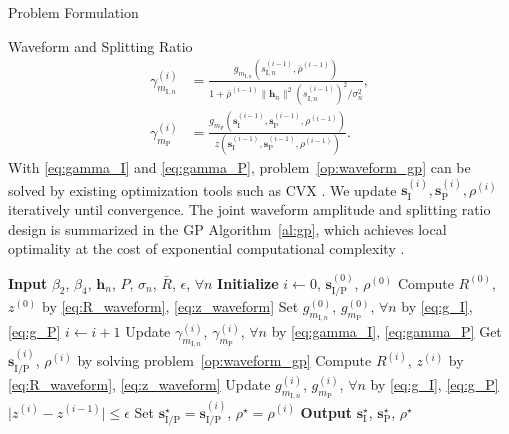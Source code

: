 \documentclass[journal]{IEEEtran}
\begin{document}
\begin{section}{Problem Formulation}
\begin{subsection}{Waveform and Splitting Ratio}
			\begin{align}
				\gamma_{m_{\mathrm{I},n}}^{(i)} & = \frac{g_{m_{\mathrm{I},n}}(s_{\mathrm{I},n}^{(i-1)},\bar{\rho}^{(i-1)})}{1+{\bar{\rho}^{(i-1)}\lVert{\boldsymbol{h}_n}\rVert^2 (s_{\mathrm{I},n}^{(i-1)})^2}\big/{\sigma_n^2}}\label{eq:gamma_I},\\
				\gamma_{m_\mathrm{P}}^{(i)} & = \frac{g_{m_\mathrm{P}}(\boldsymbol{s}_{\mathrm{I}}^{(i-1)},\boldsymbol{s}_\mathrm{P}^{(i-1)},\rho^{(i-1)})}{z(\boldsymbol{s}_{\mathrm{I}}^{(i-1)},\boldsymbol{s}_\mathrm{P}^{(i-1)},\rho^{(i-1)})}\label{eq:gamma_P}.
			\end{align}
			With \eqref{eq:gamma_I} and \eqref{eq:gamma_P}, problem~\eqref{op:waveform_gp} can be solved by existing optimization tools such as CVX \cite{Grant2008}. We update $\boldsymbol{s}_{\mathrm{I}}^{(i)},\boldsymbol{s}_\mathrm{P}^{(i)},\rho^{(i)}$ iteratively until convergence. The joint waveform amplitude and splitting ratio design is summarized in the GP Algorithm~\ref{al:gp}, which achieves local optimality at the cost of exponential computational complexity \cite{Chiang2005}.

			\begin{algorithm}[!t]
				\caption{GP: Waveform Amplitude and Splitting Ratio.}
				\label{al:gp}
				\begin{algorithmic}[1]
					\State \textbf{Input} $\beta_2$, $\beta_4$, $\boldsymbol{h}_n$, $P$, $\sigma_n$, $\bar{R}$, $\epsilon$, $\forall n$
					\State \textbf{Initialize} $i \gets 0$, $\boldsymbol{s}_{\mathrm{I/P}}^{(0)}$, $\rho^{(0)}$
					\State Compute $R^{(0)}$, $z^{(0)}$ by \eqref{eq:R_waveform}, \eqref{eq:z_waveform}
					\State Set $g_{m_{\mathrm{I},n}}^{(0)}$, $g_{m_\mathrm{P}}^{(0)}$, $\forall n$ by \eqref{eq:g_I}, \eqref{eq:g_P}
					\Repeat
						\State $i \gets i + 1$
						\State Update $\gamma_{m_{\mathrm{I},n}}^{(i)}$, $\gamma_{m_\mathrm{P}}^{(i)}$, $\forall n$ by \eqref{eq:gamma_I}, \eqref{eq:gamma_P}
						\State Get $\boldsymbol{s}_{\mathrm{I/P}}^{(i)}$, $\rho^{(i)}$ by solving problem~\eqref{op:waveform_gp}
						\State Compute $R^{(i)}$, $z^{(i)}$ by \eqref{eq:R_waveform}, \eqref{eq:z_waveform}
						\State Update $g_{m_{\mathrm{I},n}}^{(i)}$, $g_{m_\mathrm{P}}^{(i)}$, $\forall n$ by \eqref{eq:g_I}, \eqref{eq:g_P}
					\Until $\lvert z^{(i)} - z^{(i-1)} \rvert \le \epsilon$
					\State Set $\boldsymbol{s}_{\mathrm{I/P}}^{\star}=\boldsymbol{s}_{\mathrm{I/P}}^{(i)}$, $\rho^{\star}=\rho^{(i)}$
					\State \textbf{Output} $\boldsymbol{s}_{\mathrm{I}}^{\star}$, $\boldsymbol{s}_{\mathrm{P}}^{\star}$, $\rho^{\star}$
				\end{algorithmic}
			\end{algorithm}


\end{subsection}
\end{section}
\end{document}

